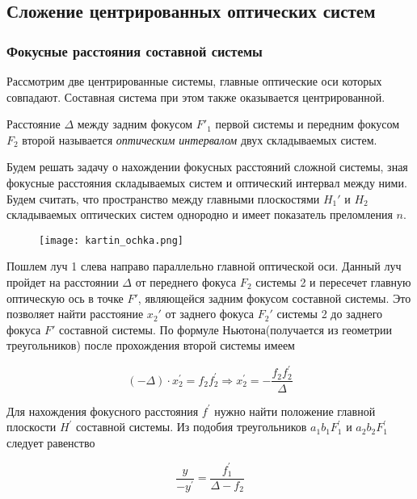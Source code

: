 \subsection{Сложение центрированных оптических систем}

\subsubsection{Фокусные расстояния составной системы}

Рассмотрим две центрированные системы, главные оптические оси которых совпадают. Составная система при этом также оказывается центрированной.

Расстояние $\Delta$ между задним фокусом $F'_1$ первой системы и передним фокусом $F_2$ второй называется \textit{оптическим интервалом} двух складываемых систем.

\bigskip

Будем решать задачу о нахождении фокусных расстояний сложной системы, зная фокусные расстояния складываемых систем и оптический интервал между ними. Будем считать, что пространство между главными плоскостями $H_1'$ и $H_2$ складываемых оптических систем однородно и имеет показатель преломления $n$.

\medskip

\begin{figure}[h!]
    \centering
    \texttt{[image: kartin\_ochka.png]}
    \label{fig:my_label}
\end{figure} 


Пошлем луч 1 слева направо параллельно главной оптической оси. Данный луч пройдет на расстоянии $\Delta$ от переднего фокуса $F_2$ системы 2 и пересечет главную оптическую ось в точке $F'$, являющейся задним фокусом составной системы. Это позволяет найти расстояние $x_2'$ от заднего фокуса $F_2'$ системы 2 до заднего фокуса $F'$ составной системы. По формуле Ньютона(получается из геометрии треугольников) после прохождения второй системы имеем 

\begin{equation*}
    (-\Delta)\cdot x_2^{'} = f_2 f_2^{'} \Rightarrow x_2^{'} = -\frac{f_2f_2^{'}}{\Delta}
\end{equation*}


Для нахождения фокусного расстояния $f^{'}$ нужно найти положение главной плоскости $H^{'}$ составной системы. Из подобия треугольников $a_1b_1F_1^{'}$ и $a_2b_2F_1^{'}$ следует равенство

\begin{equation*}
    \frac{y}{-y^{'}} = \frac{f_1^{'}}{\Delta - f_2}
\end{equation*}

